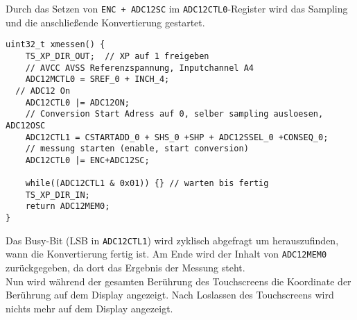 \documentclass[11pt,a4paper,ngerman]{article}
\begin{document}
\begin{description}
Durch das Setzen von \texttt{ENC + ADC12SC} im \texttt{ADC12CTL0}-Register wird das Sampling und die anschließende Konvertierung gestartet.
\begin{lstlisting}
uint32_t xmessen() {
	TS_XP_DIR_OUT;  // XP auf 1 freigeben
	// AVCC AVSS Referenzspannung, Inputchannel A4
	ADC12MCTL0 = SREF_0 + INCH_4; 
  // ADC12 On
	ADC12CTL0 |= ADC12ON;
	// Conversion Start Adress auf 0, selber sampling ausloesen, ADC12OSC
	ADC12CTL1 = CSTARTADD_0 + SHS_0 +SHP + ADC12SSEL_0 +CONSEQ_0;
	// messung starten (enable, start conversion)
	ADC12CTL0 |= ENC+ADC12SC; 
	
	while((ADC12CTL1 & 0x01)) {} // warten bis fertig
	TS_XP_DIR_IN;
	return ADC12MEM0;
}
\end{lstlisting}	
Das Busy-Bit (LSB in \texttt{ADC12CTL1}) wird zyklisch abgefragt um herauszufinden, wann die Konvertierung fertig ist. Am Ende wird der Inhalt von \texttt{ADC12MEM0} zurückgegeben, da dort das Ergebnis der Messung steht. \\

Nun wird während der gesamten Berührung des Touchscreens die Koordinate der Berührung auf dem Display angezeigt. Nach Loslassen des Touchscreens wird nichts mehr auf dem Display angezeigt.
\end{description}
\label{LastPage}
\end{document}
